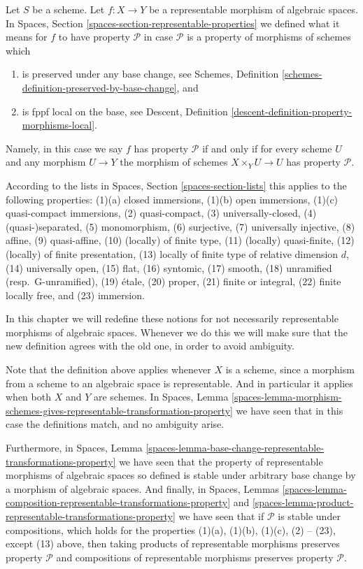 \noindent
Let $S$ be a scheme.
Let $f : X \to Y$ be a representable morphism of algebraic spaces. In
Spaces, Section \ref{spaces-section-representable-properties}
we defined what it means for $f$ to
have property $\mathcal{P}$ in case $\mathcal{P}$ is a property
of morphisms of schemes which
\begin{enumerate}
\item is preserved under any base change,
see Schemes, Definition \ref{schemes-definition-preserved-by-base-change},
and
\item is fppf local on the base, see
Descent, Definition \ref{descent-definition-property-morphisms-local}.
\end{enumerate}
Namely, in this case we say $f$ has property $\mathcal{P}$ if and only
if for every scheme $U$ and any morphism $U \to Y$ the morphism of schemes
$X \times_Y U \to U$ has property $\mathcal{P}$.

\medskip\noindent
According to the lists in
Spaces, Section \ref{spaces-section-lists}
this applies to the following properties:
(1)(a) closed immersions,
(1)(b) open immersions,
(1)(c) quasi-compact immersions,
(2) quasi-compact,
(3) universally-closed,
(4) (quasi-)separated,
(5) monomorphism,
(6) surjective,
(7) universally injective,
(8) affine,
(9) quasi-affine,
(10) (locally) of finite type,
(11) (locally) quasi-finite,
(12) (locally) of finite presentation,
(13) locally of finite type of relative dimension $d$,
(14) universally open,
(15) flat,
(16) syntomic,
(17) smooth,
(18) unramified (resp.\ G-unramified),
(19) \'etale,
(20) proper,
(21) finite or integral,
(22) finite locally free, and
(23) immersion.

\medskip\noindent
In this chapter we will redefine these notions for not necessarily
representable morphisms of algebraic spaces. Whenever we do this we will make
sure that the new definition agrees with the old one, in order to avoid
ambiguity.

\medskip\noindent
Note that the definition above applies whenever $X$ is a scheme,
since a morphism from a scheme to an algebraic space is representable.
And in particular it applies when both $X$ and $Y$ are schemes.
In
Spaces, Lemma
\ref{spaces-lemma-morphism-schemes-gives-representable-transformation-property}
we have seen that in this case the definitions
match, and no ambiguity arise.

\medskip\noindent
Furthermore, in
Spaces, Lemma
\ref{spaces-lemma-base-change-representable-transformations-property}
we have seen that the property of
representable morphisms of algebraic spaces so defined is stable under
arbitrary base change by a morphism of algebraic spaces.
And finally, in
Spaces, Lemmas
\ref{spaces-lemma-composition-representable-transformations-property} and
\ref{spaces-lemma-product-representable-transformations-property}
we have seen that if $\mathcal{P}$ is stable under compositions,
which holds for the properties
(1)(a), (1)(b), (1)(c), (2) -- (23), except (13) above, then
taking products of representable morphisms preserves property $\mathcal{P}$
and compositions of representable morphisms preserves property $\mathcal{P}$.

